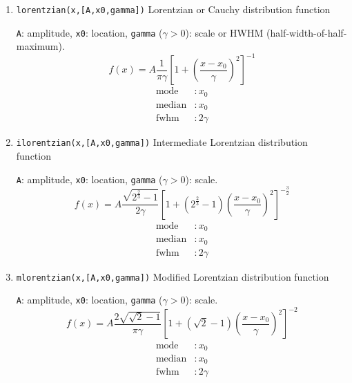\documentclass[reprint,showpacs,prb,nofootinbib,amsmath,amssymb]{revtex4-1}
\begin{document}
\begin{enumerate}
\item \verb|lorentzian(x,[A,x0,gamma])| Lorentzian or Cauchy distribution function

\verb|A|: amplitude, \verb|x0|: location, \verb|gamma| ($\gamma>0$): scale or HWHM (half-width-of-half-maximum).
\begin{equation}
f(x)=A\frac{1}{\pi\gamma}\left[1+\left(\frac{x-x_0}{\gamma}\right)^2\right]^{-1} \nonumber
\end{equation}
\begin{align}
	\mbox{mode}      	&: \mbox{$x_0$}  \nonumber \\
	\mbox{median}       &: \mbox{$x_0$}  \nonumber \\
	\mbox{fwhm} 		&: \mbox{$2\gamma$}  \nonumber
\end{align}

\item \verb|ilorentzian(x,[A,x0,gamma])| Intermediate Lorentzian distribution function~\cite{ilorentzian}

\verb|A|: amplitude, \verb|x0|: location, \verb|gamma| ($\gamma>0$): scale.
\begin{equation}
f(x)=A\frac{\sqrt{2^{\frac{2}{3}}-1}}{2\gamma}\left[1+(2^{\frac{2}{3}}-1)\left(\frac{x-x_0}{\gamma}\right)^2\right]^{-\frac{3}{2}} \nonumber
\end{equation}
\begin{align}
	\mbox{mode}      	&: \mbox{$x_0$}  \nonumber \\
	\mbox{median}       &: \mbox{$x_0$}  \nonumber \\	
	\mbox{fwhm} 		&: \mbox{$2\gamma$}  \nonumber
\end{align}

\item \verb|mlorentzian(x,[A,x0,gamma])| Modified Lorentzian distribution function~\cite{mlorentzian}

\verb|A|: amplitude, \verb|x0|: location, \verb|gamma| ($\gamma>0$): scale.
\begin{equation}
f(x)=A\frac{2\sqrt{\sqrt{2}-1}}{\pi\gamma}\left[1+(\sqrt{2}-1)\left(\frac{x-x_0}{\gamma}\right)^2\right]^{-2} \nonumber
\end{equation}
\begin{align}
	\mbox{mode}      	&: \mbox{$x_0$}  \nonumber \\
	\mbox{median}       &: \mbox{$x_0$}  \nonumber \\
	\mbox{fwhm} 		&: \mbox{$2\gamma$}  \nonumber
\end{align}


\end{enumerate}
\end{document}
